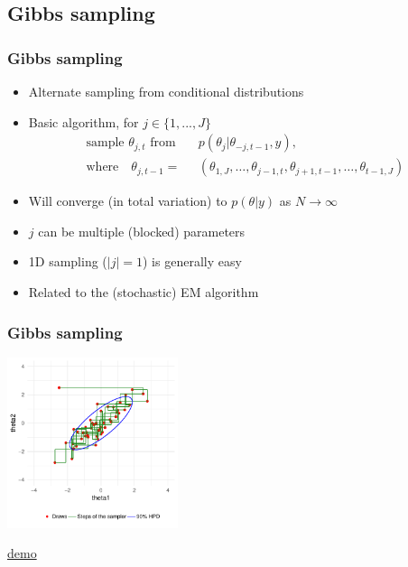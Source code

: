 \documentclass[10pt]{beamer}
\begin{document}
\subsection{Gibbs sampling}

\begin{frame}

\frametitle{Gibbs sampling}

  \begin{itemize}
  \item Alternate sampling from conditional distributions
  \item Basic algorithm, for $j \in \{1,...,J\}$ {
      \begin{align*}
         \text{sample $\theta_{j,t}$ from} \quad & p(\theta_j|\theta_{-j,t-1}, y),\\
      \text{where} \quad
         \theta_{j,t-1} = & (\theta_{1,J},\dots,\theta_{j-1,t},
        \theta_{j+1,t-1},\dots,\theta_{t-1,J})
      \end{align*}
      }
  \item Will converge (in total variation) to $p(\theta|y)$ as $N\rightarrow\infty$\pause
  \item $j$ can be multiple (blocked) parameters
  \item 1D sampling ($|j|=1$) is generally easy\pause
  \item Related to the (stochastic) EM algorithm
  \end{itemize}
\end{frame}

\begin{frame}

\frametitle{Gibbs sampling}

    \vspace{-.5\baselineskip}
     \begin{center}
       \includegraphics[width=5cm]{figs/Gibbs1.pdf}
     \end{center}
    \vspace{-.5\baselineskip}
     \begin{center}
       \href{https://github.com/MansMeg/BSDA/blob/main/lectures/L5/figs/gibbs_example.gif}{demo}
     \end{center}
\end{frame}
\end{document}
